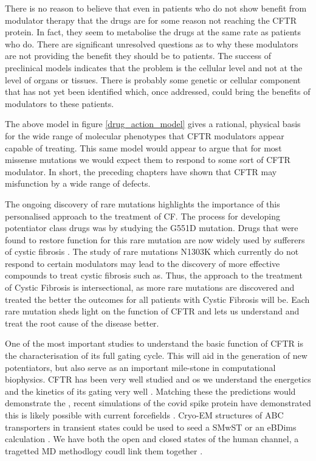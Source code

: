 There is no reason to believe that even in patients who do not show benefit from modulator therapy that the drugs are for some reason not reaching the CFTR protein. In fact, they seem to metabolise the drugs at the same rate as patients who do. There are significant unresolved questions as to why these modulators are not providing the benefit they should be to patients. The success of preclinical models indicates that the problem is the cellular level and not at the level of organs or tissues. There is probably some genetic or cellular component that has not yet been identified which, once addressed, could bring the benefits of modulators to these patients.






The above model in figure \ref{drug_action_model} gives a rational, physical basis for the wide range of molecular phenotypes that CFTR modulators appear capable of treating. This same model would appear to argue that for most missense mutations we would expect them to respond to some sort of CFTR modulator. In short, the preceding chapters have shown that CFTR may misfunction by a wide range of defects. 

The ongoing discovery of rare mutations highlights the importance of this personalised approach to the treatment of CF. The process for developing potentiator class drugs was by studying the G551D mutation. Drugs that were found to restore function for this rare mutation are now widely used by sufferers of cystic fibrosis \cite{vangoor2009}. The study of rare mutations N1303K which currently do not respond to certain modulators may lead to the discovery of more effective compounds to treat cystic fibrosis such as. Thus, the approach to the treatment of Cystic Fibrosis is intersectional, as more rare mutations are discovered and treated the better the outcomes for all patients with Cystic Fibrosis will be. Each rare mutation sheds light on the function of CFTR and lets us understand and treat the root cause of the disease better.

One of the most important studies to understand the basic function of CFTR is the characterisation of its full gating cycle. This will aid in the generation of new potentiators, but also serve as an important mile-stone in computational biophysics. CFTR has been very well studied and os we understand the energetics and the kinetics of its gating very well \cite{csanady2017}. Matching these the predictions would demonstrate the , recent simulations of the covid spike protein have demonstrated this is likely possible with current forcefields \cite{casalino2021}. Cryo-EM structures of ABC transporters in transient states could be used to seed a SMwST or an eBDims calculation \cite{hofmann2019, orellana2016, roux2021, pan2008}. We have both the open and closed states of the human channel, a tragetted MD methodlogy coudl link them together \cite{zhang2018, liu2017, moradi2015}.

